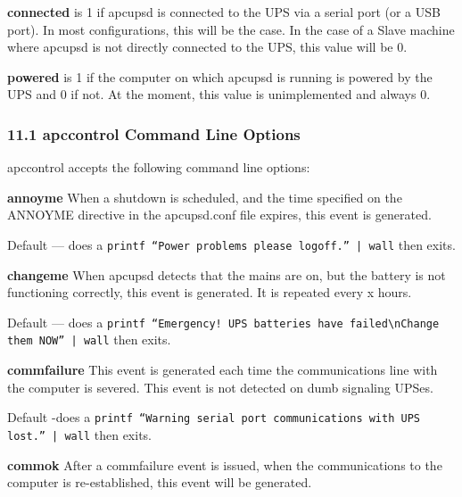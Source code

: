 {{{{{{{{{\begin{description}
\item {\bf connected}
is 1 if apcupsd is connected to the UPS via a serial port (or a USB port). In
most configurations, this will be the case. In the case of a Slave machine
where apcupsd is not directly connected to the UPS, this value will be 0.  

\item {\bf powered}
is 1 if the computer on which apcupsd is running is powered by the UPS and 0
if not.  At the moment, this value is unimplemented and always 0. 
\end{description}

\label{apccontrol-Command-Line-Options}

\subsubsection*{11.1 apccontrol Command Line Options}

apccontrol accepts the following command line options:  

\begin{description}

\item {\bf annoyme}
When a shutdown is scheduled, and the time specified on the ANNOYME directive
in the apcupsd.conf file expires, this event is generated.  

Default {---} does a {\tt printf ``Power problems please logoff.'' | wall}
then exits.  

\item {\bf changeme}
When apcupsd detects that the mains are on, but the battery is not functioning
correctly, this event is generated. It is repeated every x hours.  

Default {---} does a {\tt printf ``Emergency! UPS batteries have
failed\textbackslash{}nChange them NOW'' | wall} then exits.  

\item {\bf commfailure}
This event is generated each time the communications line with the computer is
severed. This event is not detected on dumb signaling UPSes.  

Default -does a {\tt printf ``Warning serial port communications with UPS
lost.'' | wall} then exits.  

\item {\bf commok}
After a commfailure event is issued, when the communications to the computer
is re-established, this event will be generated.  


\end{description}}}}}}}}}}

